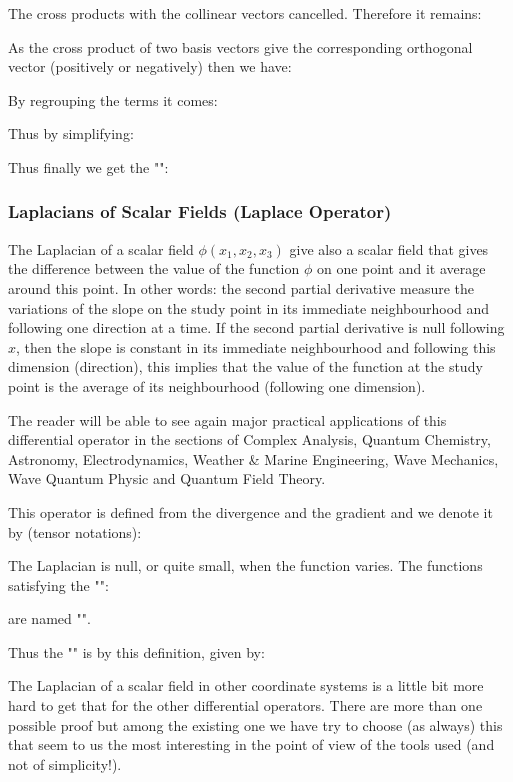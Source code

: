 	The cross products with the collinear vectors cancelled. Therefore it remains:
	
	As the cross product of two basis vectors give the corresponding orthogonal vector (positively or negatively) then we have:
	
	By regrouping the terms it comes:
	
	Thus by simplifying:
	
	Thus finally we get the "\label{rotational in spherical coordinates}":
	
	
	\pagebreak
	\subsubsection{Laplacians of Scalar Fields (Laplace Operator)}\label{scalar laplacian}
	The Laplacian of a scalar field $\phi(x_1,x_2,x_3)$ give also a scalar field that gives the difference between the value of the function $\phi$ on one point and it average around this point. In other words: the second partial derivative measure the variations of the slope on the study point in its immediate neighbourhood and following one direction at a time. If the second partial derivative is null following $x$, then the slope is constant in its immediate neighbourhood and following this dimension (direction), this implies that the value of the function at the study point is the average of its neighbourhood (following one dimension).
	
	The reader will be able to see again major practical applications of this differential operator in the sections of Complex Analysis, Quantum Chemistry, Astronomy, Electrodynamics, Weather \& Marine Engineering, Wave Mechanics, Wave Quantum Physic and Quantum Field Theory.
	
	This operator is defined from the divergence and the gradient and we denote it by (tensor notations):
	
	The Laplacian is null, or quite small, when the function varies. The functions satisfying the "":
	
	are named "".
	
	Thus the "" is by this definition, given by:
	
	The Laplacian of a scalar field in other coordinate systems is a little bit more hard to get that for the other differential operators. There are more than one possible proof but among the existing one we have try to choose (as always) this that seem to us the most interesting in the point of view of the tools used (and not of simplicity!).

